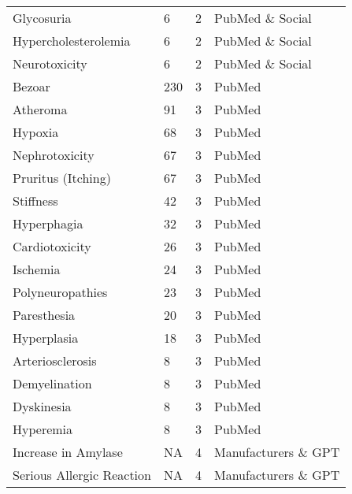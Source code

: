 \documentclass[referee,bst/sn-basic]{sn-jnl}%
\theoremstyle{thmstyletwo}%
\theoremstyle{thmstylethree}%
\begin{document}
\begin{appendices}
\begin{longtable}{llll}
Glycosuria                               & 6         & 2    & PubMed \& Social        \\
Hypercholesterolemia                     & 6         & 2    & PubMed \& Social        \\
Neurotoxicity                            & 6         & 2    & PubMed \& Social        \\
Bezoar                                   & 230       & 3    & PubMed                  \\
Atheroma                                 & 91        & 3    & PubMed                  \\
Hypoxia                                  & 68        & 3    & PubMed                  \\
Nephrotoxicity                           & 67        & 3    & PubMed                  \\
Pruritus (Itching)                       & 67        & 3    & PubMed                  \\
Stiffness                                & 42        & 3    & PubMed                  \\
Hyperphagia                              & 32        & 3    & PubMed                  \\
Cardiotoxicity                           & 26        & 3    & PubMed                  \\
Ischemia                                 & 24        & 3    & PubMed                  \\
Polyneuropathies                         & 23        & 3    & PubMed                  \\
Paresthesia                              & 20        & 3    & PubMed                  \\
Hyperplasia                              & 18        & 3    & PubMed                  \\
Arteriosclerosis                         & 8         & 3    & PubMed                  \\
Demyelination                            & 8         & 3    & PubMed                  \\
Dyskinesia                               & 8         & 3    & PubMed                  \\
Hyperemia                                & 8         & 3    & PubMed                  \\
Increase in Amylase                      & NA        & 4    & Manufacturers \& GPT    \\
Serious Allergic Reaction                & NA        & 4    & Manufacturers \& GPT    \\

\end{longtable}
\end{appendices}
\end{document}
